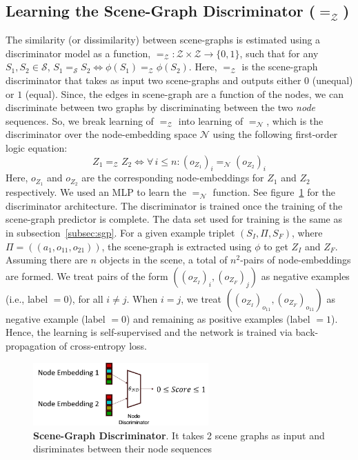 \subsection{Learning the Scene-Graph Discriminator ($=_\mathcal{Z}$)}
\label{subsec:sgd}
The similarity (or dissimilarity) between scene-graphs is estimated using a discriminator model as a function, $=_\mathcal{Z}: \mathcal{Z} \times \mathcal{Z} \rightarrow \{0, 1\}$, such that for any $S_1, S_2 \in \mathcal{S}$, $S_1 =_\mathcal{S} S_2 \iff \phi(S_1) =_\mathcal{Z} \phi(S_2)$. Here, $=_\mathcal{Z}$ is the scene-graph discriminator that takes as input two scene-graphs and outputs either $0$ (unequal) or $1$ (equal). Since, the edges in scene-graph are a function of the nodes, we can discriminate between two graphs by discriminating between the two \textit{node} sequences. So, we break learning of $=_\mathcal{Z}$ into learning of $=_\mathcal{N}$, which is the discriminator over the node-embedding space $\mathcal{N}$ using the following first-order logic equation:
\begin{equation}\label{eqn:esg}
    Z_1 =_\mathcal{Z} Z_2 \iff \forall \, i \leq n : (o_{Z_1})_i =_\mathcal{N} (o_{Z_2})_i
\end{equation}
Here, $o_{Z_1}$ and $o_{Z_2}$ are the corresponding node-embeddings for $Z_1$ and $Z_2$ respectively. We used an MLP to learn the $=_\mathcal{N}$ function. See figure~\ref{fig:disc-arch} for the discriminator architecture. The discriminator is trained once the training of the scene-graph predictor is complete. The data set used for training is the same as in subsection~\ref{subsec:sgp}. For a given example triplet $(S_I, \Pi, S_F)$, where $\Pi = ((a_1, o_{11}, o_{21}))$, the scene-graph is extracted using $\phi$ to get $Z_I$ and $Z_F$. Assuming there are $n$ objects in the scene, a total of $n^2$-pairs of node-embeddings are formed. We treat pairs of the form $((o_{Z_I})_i, (o_{Z_F})_j)$ as negative examples (i.e., label $= 0$), for all $i \neq j$. When $i = j$, we treat $((o_{Z_I})_{o_{11}}, (o_{Z_F})_{o_{11}})$ as negative example (label $= 0$) and remaining as positive examples (label $= 1$). Hence, the learning is self-supervised and the network is trained via back-propagation of cross-entropy loss.

\begin{figure}
    \centering
    \includegraphics[width=0.6\textwidth]{assets/discriminator.png}
    \caption{\textbf{Scene-Graph Discriminator}. It takes 2 scene graphs as input and disriminates between their node sequences}
    \label{fig:disc-arch}
\end{figure}

